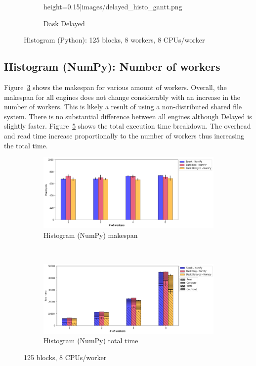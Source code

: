 \documentclass[conference]{IEEEtran}
\begin{document}
\begin{figure}[!t]
\begin{subfigure}[b]{\columnwidth}
{        height=0.15\textheight]{images/delayed_histo_gantt.png}}
        \caption{Dask Delayed}\label{fig:histo_dask_delayed_gantt}
    \end{subfigure}
    \caption{Histogram (Python): 125 blocks, 8 workers, 8
    CPUs/worker}\label{fig:histo_gantt}
\end{figure}

\subsection{Histogram (NumPy): Number of workers}
Figure~\ref{fig:histo_np_ms_worker} shows the makespan for various amount of workers.
Overall, the makespan for all engines does not change considerably with an increase
in the number of workers. This is likely a result of using a non-distributed
shared file system. There is no
substantial difference between all engines although Delayed is slightly faster.
Figure~\ref{fig:histo_np_tt_worker} shows the total execution time
breakdown. The overhead and read time increase proportionally to the number
of workers thus increasing the total time. 

\begin{figure}[!b]
    \centering
    \begin{subfigure}[b]{\columnwidth}
        \includegraphics[clip,width=\columnwidth]{images/histo_np_worker.png}%
        \caption{Histogram (NumPy) makespan}\label{fig:histo_np_ms_worker}
    \end{subfigure}
    \\
    \begin{subfigure}[b]{\columnwidth}
        \includegraphics[clip,width=\columnwidth]{images/histo_idle_np_worker.png}%
        \caption{Histogram (NumPy) total time}\label{fig:histo_np_tt_worker}
    \end{subfigure}
    \caption{125 blocks, 8 CPUs/worker}
\end{figure}
\end{document}

